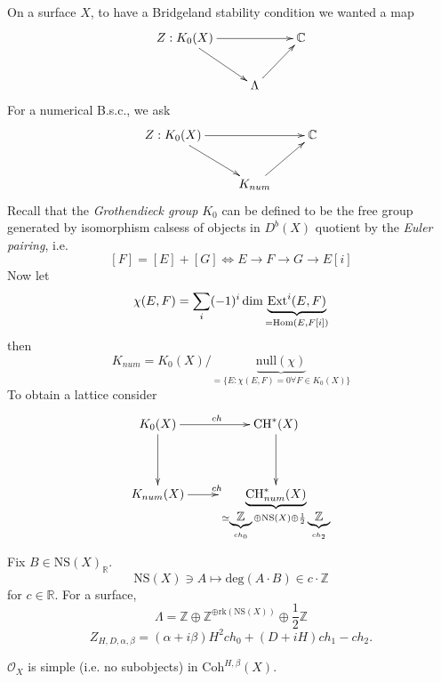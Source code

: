 On a surface $X$, to have a Bridgeland
stability condition we wanted a map
$$
\xymatrix{
Z:K_0(X)\ar[rr]\ar[dr]&  &  \mathbb{C}\\
&  \Lambda\ar[ur]
}
$$
For a numerical B.s.c., we ask
$$
\xymatrix{
Z:K_0(X)\ar[rr]\ar[dr]&  &  \mathbb{C}\\
&  K_{num}\ar[ur]
}
$$
Recall that the {\it Grothendieck group}
$K_0$ can be defined to be the free group
generated by isomorphism calsess of objects
in $D^b(X)$ quotient by the {\it Euler
pairing}, i.e.
$$
[F]=[E]+[G] \iff E \to F \to G \to E[i]
$$
Now let
$$
\chi(E,F)=\sum_{i}(-1)^{i}\dim
\underbrace{\text{Ext}^i(E,F)}
_{=\mathop{\mathrm{Hom}}\nolimits(E,F[i])}
$$
then
$$
K_{num}=K_0(X)/\underbrace{\text{null}(\chi)}
_{=\{E:\chi(E,F)=0\forall F\in K_0(X)\}}
$$
To obtain a lattice consider
$$
\xymatrix{
K_0(X)\ar[d]\ar[r]^{ch}& \CH^* (X)\ar[d]\\
K_{num}(X)\ar[r]^{ch}&\underbrace{\CH^*_{num}
(X)}
_{\simeq \underbrace{\mathbb{Z}}_{ch_0}
\oplus \text{NS}(X) \oplus
\frac{1}{2}\underbrace{\mathbb{Z}}_{ch_2}}
}
$$
Fix $B \in \text{NS}(X)_{\mathbb{R}}$.
$$
\text{NS}(X)\ni A \mapsto \text{deg}(A\cdot
B)
\in
c\cdot \mathbb{Z}
$$
for $c \in \mathbb{R}$. For a surface,
$$
\Lambda = \mathbb{Z} \oplus
\mathbb{Z}^{\oplus \text{rk}(\text{NS}(X))}
\oplus \frac{1}{2}\mathbb{Z}
$$
$$
Z_{H,D,\alpha,\beta}=(\alpha+i \beta)H^2
ch_0+(D+iH)ch_1-ch_2.
$$

\begin{exercise}
\label{exercise-Ox-is-simple}
$\mathcal{O}_X$ is simple (i.e. no
subobjects) in $\text{Coh}^{H,\beta}(X)$.
\end{exercise}


